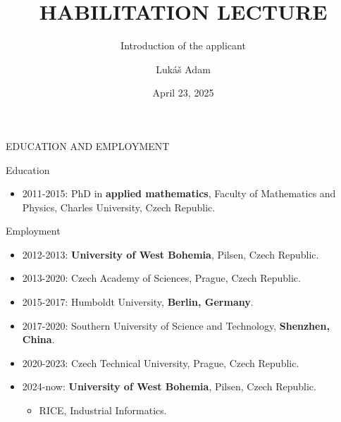 \documentclass[11pt, aspectratio=169]{beamer}
\title{HABILITATION LECTURE}
\subtitle{Introduction of the applicant}
\author{Lukáš Adam}
\date{April 23, 2025}
\newenvironment{wideitemize}{\itemize\addtolength{\itemsep}{10pt}}{\enditemize}
\begin{document}

\begin{frame}
	\maketitle
\end{frame}


\begin{frame}{EDUCATION AND EMPLOYMENT}
\begin{wideitemize}
\item Education
\begin{itemize}
\item 2011-2015: PhD in \textbf{applied mathematics}, Faculty of Mathematics and Physics, Charles University, Czech Republic.
\end{itemize}
\pause \item Employment
\begin{itemize}
\item 2012-2013: \textbf{University of West Bohemia}, Pilsen, Czech Republic.
\item 2013-2020: Czech Academy of Sciences, Prague, Czech Republic.
\pause \item 2015-2017: Humboldt University, \textbf{Berlin, Germany}.
\item 2017-2020: Southern University of Science and Technology, \textbf{Shenzhen, China}.
\pause \item 2020-2023: Czech Technical University, Prague, Czech Republic.
\item 2024-now: \textbf{University of West Bohemia}, Pilsen, Czech Republic.
\begin{itemize}
\item RICE, Industrial Informatics.
\end{itemize}
\end{itemize}
\end{wideitemize}
\end{frame}
\end{document}

